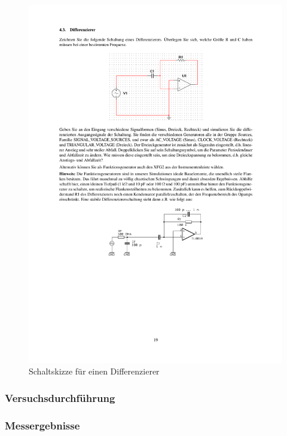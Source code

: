 \documentclass[12pt,a4paper]{article}
\begin{document}
\begin{figure}[H] 
  \centering
    \includegraphics[trim = 10mm 200mm 10mm 40mm, clip, scale = 1]{ep5_14[Page19].pdf}
  	\caption[Schaltskizze für einen Differenzierer]{Schaltskizze für einen Differenzierer\footnotemark}
  \label{fig:1}
\end{figure}

\subsubsection{Versuchsdurchführung}

\subsubsection{Messergebnisse}
\end{document}
